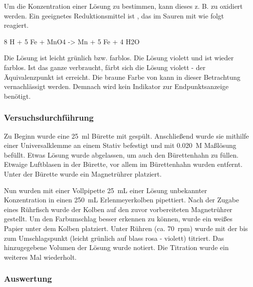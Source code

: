 \documentclass{article}
\begin{document}
        Um die Konzentration einer  Lösung zu bestimmen, kann dieses z. B. zu  oxidiert werden. Ein geeignetes Reduktionsmittel ist , das im Sauren mit  wie folgt reagiert.
        
        \begin{reaction}
          8 H\pch{}\aq{} + 5 Fe\pch[2]\aq{} + MnO4\mch\aq{} -> Mn\pch[2]\aq{} + 5 Fe\pch[3]\aq{} + 4 H2O       
        \end{reaction}
        
        Die  Lösung ist leicht grünlich bzw. farblos. Die  Lösung violett und  ist wieder farblos. Ist das ganze  verbraucht, färbt sich die Lösung violett - der Äquivalenzpunkt ist erreicht. Die braune Farbe von  kann in dieser Betrachtung vernachlässigt werden. Demnach wird kein Indikator zur Endpunktsanzeige benötigt. 
        
      \subsubsection{Versuchsdurchführung} \label{sec:VersuchFe}
        
        Zu Beginn wurde eine \SI[mode=text,separate-uncertainty=true]{25}{\milli\litre} Bürette mit  gespült. Anschließend wurde sie mithilfe einer Universalklemme an einem Stativ befestigt und mit \SI[mode=text]{0.020}{M}  Maßlösung befüllt. Etwas Lösung wurde abgelassen, um auch den Bürettenhahn zu füllen. Etwaige Luftblasen in der Bürette, vor allem im Bürettenhahn wurden entfernt. Unter der Bürette wurde ein Magnetrührer platziert. 
        
        Nun wurden mit einer Vollpipette \SI[mode=text]{25}{\milli\liter} einer  Lösung unbekannter Konzentration in einen \SI[mode=text]{250}{\milli\liter} Erlenmeyerkolben pipettiert. Nach der Zugabe eines Rührfisch wurde der Kolben auf den zuvor vorbereiteten Magnetrührer gestellt. Um den Farbumschlag besser erkennen zu können, wurde ein weißes Papier unter dem Kolben platziert.  Unter Rühren (ca. \SI[mode=text]{70}{rpm}) wurde mit der  bis zum Umschlagspunkt (leicht grünlich auf blass rosa - violett) titriert. Das hinzugegebene Volumen der  Lösung wurde notiert. Die Titration wurde ein weiteres Mal wiederholt.
        
      \subsubsection{Auswertung}
        
\end{document}
